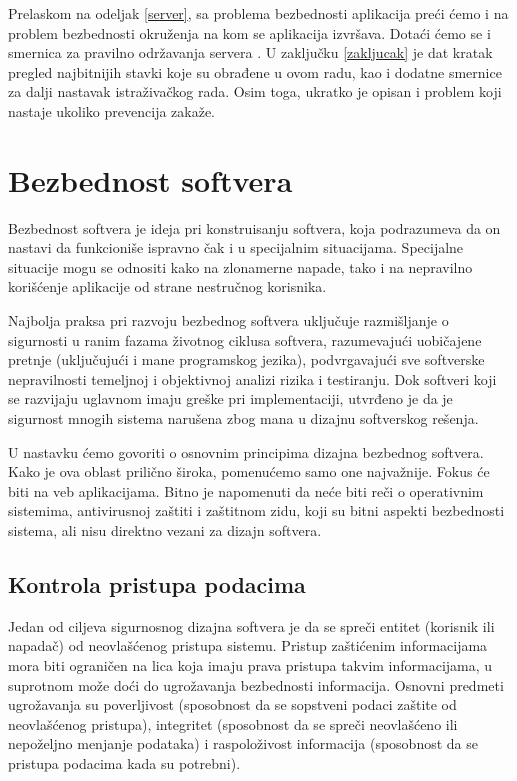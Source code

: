 \documentclass[a4paper]{article}
\begin{document}
Prelaskom na odeljak \ref{server}, sa problema bezbednosti aplikacija preći ćemo i na problem bezbednosti okruženja na kom se aplikacija izvršava. Dotaći ćemo se i smernica za pravilno održavanja servera \cite{WS}. U zaklju\v{c}ku \ref{zakljucak} je dat kratak pregled najbitnijih stavki koje su obrađene u ovom radu, kao i dodatne smernice za dalji nastavak istraživačkog rada. Osim toga, ukratko je opisan i problem koji nastaje ukoliko prevencija zakaže.

\section{Bezbednost softvera} \label{bezbednost}

Bezbednost softvera je ideja pri konstruisanju softvera, koja podrazumeva da on nastavi da funkcioniše ispravno čak i u specijalnim situacijama. Specijalne situacije mogu se odnositi kako na zlonamerne napade, tako i na nepravilno korišćenje aplikacije od strane nestručnog korisnika.

Najbolja praksa pri razvoju bezbednog softvera uključuje razmišljanje o sigurnosti u ranim fazama životnog ciklusa softvera, razumevajući uobičajene pretnje (uključujući i mane programskog jezika), podvrgavajući sve softverske nepravilnosti temeljnoj i objektivnoj analizi rizika i testiranju. Dok softveri koji se razvijaju uglavnom imaju greške pri implementaciji, utvrđeno je da je sigurnost mnogih sistema narušena zbog mana u dizajnu softverskog rešenja.

U nastavku ćemo govoriti o osnovnim principima dizajna bezbednog softvera. Kako je ova oblast prilično široka, pomenućemo samo one najvažnije. Fokus će biti na veb aplikacijama. Bitno je napomenuti da neće biti reči o operativnim sistemima, antivirusnoj zaštiti i zaštitnom zidu, koji su bitni aspekti bezbednosti sistema, ali nisu direktno vezani za dizajn softvera.

\subsection{Kontrola pristupa podacima}

Jedan od ciljeva sigurnosnog dizajna softvera je da se spreči entitet (korisnik ili napadač) od neovlašćenog pristupa sistemu. Pristup zaštićenim informacijama mora biti ograničen na lica koja imaju prava pristupa takvim informacijama, u suprotnom može doći do ugrožavanja bezbednosti informacija. Osnovni predmeti ugrožavanja su poverljivost (sposobnost da se sopstveni podaci zaštite od neovlašćenog pristupa), integritet (sposobnost da se spreči neovlašćeno ili nepoželjno menjanje podataka) i raspoloživost informacija (sposobnost da se pristupa podacima kada su potrebni).
\end{document}
